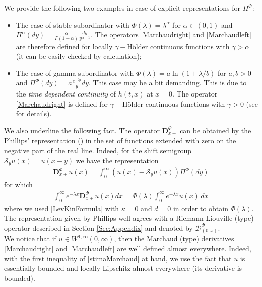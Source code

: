 \documentclass[11pt,a4paper]{article}
\theoremstyle{plain}
\theoremstyle{definition}
\theoremstyle{remark}
\begin{document}
	
	We provide the following two examples in case of explicit representations for $\Pi^\Phi$: 
	\begin{itemize}
		\item[-] The case of stable subordinator with $\Phi(\lambda)=\lambda^\alpha$ for $\alpha \in (0,1)$ and $\Pi^\alpha(dy)=\frac{\alpha}{\Gamma(1-\alpha)} \frac{dy}{y^{\alpha+1}}$. The operators \eqref{Marchaudright} and \eqref{Marchaudleft} are therefore defined for locally $\gamma-$H\"{o}lder continuous functions with $\gamma > \alpha$ (it can be easily checked by calculation);
		\item[-] The case of gamma subordinator with $\Phi(\lambda) = a\ln (1+\lambda/b)$ for $a,b>0$ and $\Pi^\Phi(dy)=a \frac{e^{-by}}{y} dy$. This case may be a bit demanding. This is due to the \textit{time dependent continuity} of $h(t,x)$ at $x=0$. The operator \eqref{Marchaudright} is defined for $\gamma-$H\"{o}lder continuous functions with $\gamma >0$ (see \cite{colantoni2021inverse} for details).
	\end{itemize}
	
	
	We also underline the following fact. The operator $\mathbf{D}_{x+}^\Phi$ can be obtained by the Phillips' representation (\cite{phillips1952generation}) in the set of functions extended with zero on the negative part of the real line. Indeed, for the shift semigroup $\mathcal{S}_y u(x) = u(x-y)$ we have the representation 
	\begin{align*}
		\mathbf{D}_{x+}^\Phi u(x)=\int_0^\infty (u(x) -\mathcal{S}_y u(x))\Pi^\Phi(dy)
	\end{align*}
	for which 
	\begin{align}
		\label{LapMarchaud}
		\int_0^\infty e^{-\lambda x} \mathbf{D}_{x+}^\Phi u(x) dx= \Phi(\lambda) \int_0^\infty e^{-\lambda x} u(x)\,dx
	\end{align}
	where we used \eqref{LevKinFormula} with $\kappa=0$ and $d=0$ in order to obtain $\Phi(\lambda)$. The representation given by Phillips well agrees with a Riemann-Liouville (type) operator described in Section \ref{Sec:Appendix} and denoted by $\mathcal{D}^\Phi_{(0,x)}$.  \\
	
	
	We notice that if $u \in W^{1,\infty}(0, \infty)$, then the Marchaud (type) derivatives \eqref{Marchaudright} and \eqref{Marchaudleft} are well defined almost everywhere. Indeed, with the first inequality of \eqref{stimaMarchaud} at hand, we use the fact that $u$ is essentially bounded and locally Lipschitz almost everywhere (its derivative is bounded).
	
\end{document}
